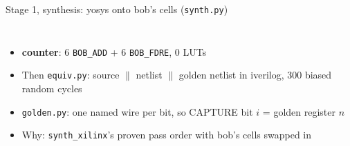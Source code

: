\documentclass[aspectratio=169,11pt]{beamer}
\begin{document}
\begin{frame}{Stage 1, synthesis: yosys onto bob's cells (\texttt{synth.py})}
\begin{columns}[T]
    \footnotesize
    \begin{itemize}
      \item \textbf{counter}: 6 \texttt{BOB\_ADD} + 6 \texttt{BOB\_FDRE}, 0 LUTs
      \item Then \texttt{equiv.py}: source $\parallel$ netlist $\parallel$ golden netlist in iverilog, 300 biased random cycles
      \item \texttt{golden.py}: one named wire per bit, so CAPTURE bit $i$ = golden register $n$
      \item Why: \texttt{synth\_xilinx}'s proven pass order with bob's cells swapped in
    \end{itemize}
  \end{columns}
\end{frame}

\end{document}
